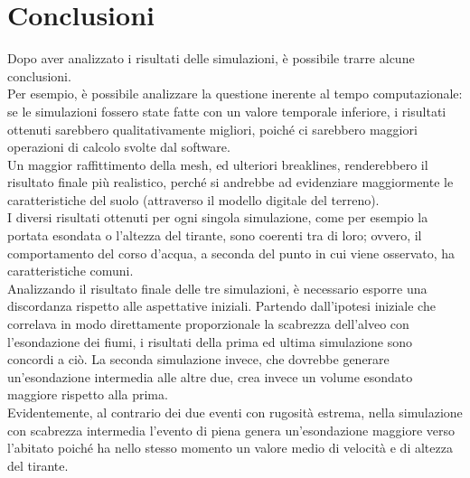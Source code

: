 \section{Conclusioni}
Dopo aver analizzato i risultati delle simulazioni, è possibile trarre alcune conclusioni.\\
Per esempio, è possibile analizzare la questione inerente al tempo computazionale: se le simulazioni fossero state fatte con un valore temporale inferiore, i risultati ottenuti sarebbero qualitativamente migliori, poiché ci sarebbero maggiori operazioni di calcolo svolte dal software.\\
Un maggior raffittimento della mesh, ed ulteriori breaklines, renderebbero il risultato finale più realistico, perché si andrebbe ad evidenziare maggiormente le caratteristiche del suolo (attraverso il modello digitale del terreno).\\
I diversi risultati ottenuti per ogni singola simulazione, come per esempio la portata esondata o l'altezza del tirante, sono coerenti tra di loro; ovvero, il comportamento del corso d'acqua, a seconda del punto in cui viene osservato, ha caratteristiche comuni.\\
Analizzando il risultato finale delle tre simulazioni, è necessario esporre una discordanza rispetto alle aspettative iniziali. Partendo dall'ipotesi iniziale che correlava in modo direttamente proporzionale la scabrezza dell'alveo con l'esondazione dei fiumi, i risultati della prima ed ultima simulazione sono concordi a ciò. La seconda simulazione invece, che dovrebbe generare un'esondazione intermedia alle altre due, crea invece un volume esondato maggiore rispetto alla prima.\\
Evidentemente, al contrario dei due eventi con rugosità estrema, nella simulazione con scabrezza intermedia l'evento di piena genera un'esondazione maggiore verso l'abitato poiché ha nello stesso momento un valore medio di velocità e di altezza del tirante.
